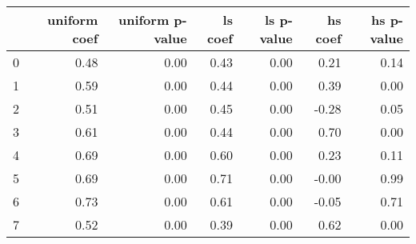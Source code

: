 \begin{tabular}{lrrrrrr}
\toprule
 & uniform coef & uniform p-value & ls coef & ls p-value & hs coef & hs p-value \\
\midrule
0 & 0.48 & 0.00 & 0.43 & 0.00 & 0.21 & 0.14 \\
1 & 0.59 & 0.00 & 0.44 & 0.00 & 0.39 & 0.00 \\
2 & 0.51 & 0.00 & 0.45 & 0.00 & -0.28 & 0.05 \\
3 & 0.61 & 0.00 & 0.44 & 0.00 & 0.70 & 0.00 \\
4 & 0.69 & 0.00 & 0.60 & 0.00 & 0.23 & 0.11 \\
5 & 0.69 & 0.00 & 0.71 & 0.00 & -0.00 & 0.99 \\
6 & 0.73 & 0.00 & 0.61 & 0.00 & -0.05 & 0.71 \\
7 & 0.52 & 0.00 & 0.39 & 0.00 & 0.62 & 0.00 \\
\bottomrule
\end{tabular}
